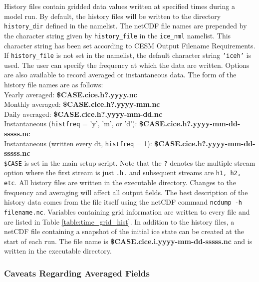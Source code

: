 
History files contain gridded data values written at specified times
during a model run.  By default, the history files will be written to
the directory {\tt history\_dir} defined in the namelist. 
The netCDF file names are prepended by the character
string given by {\tt history\_file} in the {\tt ice\_nml} namelist.
This character string has been set according to CESM Output Filename Requirements.
If {\tt history\_file} is not set in the namelist, the default character string
{\tt 'iceh'} is used. The user can specify the frequency at which the data
are written. Options are also available to record averaged or instantaneous data.
The form of the history file names are as follows: \\

\noindent Yearly averaged:  {\bf \$CASE.cice.h?.yyyy.nc} \\
Monthly averaged: {\bf \$CASE.cice.h?.yyyy-mm.nc} \\
Daily averaged: {\bf \$CASE.cice.h?.yyyy-mm-dd.nc} \\
Instantaneous ({\tt histfreq} = 'y', 'm', or 'd'): {\bf \$CASE.cice.h?.yyyy-mm-dd-sssss.nc} \\
Instantaneous (written every dt, {\tt histfreq} = 1): {\bf \$CASE.cice.h?.yyyy-mm-dd-sssss.nc} \\

{\tt \$CASE} is set in the main setup script. Note that the {\tt ?} denotes the
multiple stream option where the first stream is just {\tt .h.} and subsequent
streams are {\tt h1, h2, etc}. All history files are written
in the executable directory.  Changes to the frequency and
averaging will affect all output fields.  The best description
of the history data comes from the file itself using the netCDF command
{\tt ncdump -h filename.nc}.  Variables containing grid information are
written to every file and are listed in Table \ref{table:time_grid_hist}.
In addition to the history files, a netCDF file containing a snapshot
of the initial ice state can be created at the start of each run.  The file
name is {\bf \$CASE.cice.i.yyyy-mm-dd-sssss.nc} and is written
in the executable directory.

\subsubsection{Caveats Regarding Averaged Fields} 
\label{avg_fields}

